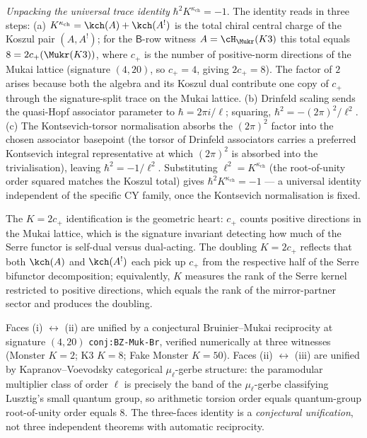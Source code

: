 \begin{theorem}
\emph{Unpacking the universal trace identity} $\hbar^2 K^{\kappa_{\mathrm{ch}}}
= -1$. The identity reads in three steps: (a) $K^{\kappa_{\mathrm{ch}}}
= \kch(A) + \kch(A^!)$ is the total chiral central charge of the
Koszul pair $(A, A^!)$; for the $\mathsf{B}$-row witness $A =
\cH_{\Mukr}(K3)$ this total equals $8 = 2c_+(\Mukr(K3))$, where $c_+$
is the number of positive-norm directions of the Mukai lattice
(signature $(4, 20)$, so $c_+ = 4$, giving $2c_+ = 8$). The factor of
$2$ arises because both the algebra and its Koszul dual contribute one
copy of $c_+$ through the signature-split trace on the Mukai lattice.
(b) Drinfeld scaling sends the quasi-Hopf associator parameter to
$\hbar = 2\pi i / \ell$; squaring, $\hbar^2 = -(2\pi)^2/\ell^2$. (c)
The Kontsevich-torsor normalisation absorbs the $(2\pi)^2$ factor
into the chosen associator basepoint (the torsor of Drinfeld
associators carries a preferred Kontsevich integral representative
at which $(2\pi)^2$ is absorbed into the trivialisation), leaving
$\hbar^2 = -1/\ell^2$. Substituting $\ell^2 = K^{\kappa_{\mathrm{ch}}}$
(the root-of-unity order squared matches the Koszul total) gives
$\hbar^2 K^{\kappa_{\mathrm{ch}}} = -1$ --- a universal identity
independent of the specific CY family, once the Kontsevich
normalisation is fixed.

The $K = 2c_+$ identification is the geometric heart: $c_+$ counts
positive directions in the Mukai lattice, which is the signature
invariant detecting how much of the Serre functor is self-dual versus
dual-acting. The doubling $K = 2c_+$ reflects that both $\kch(A)$ and
$\kch(A^!)$ each pick up $c_+$ from the respective half of the
Serre bifunctor decomposition; equivalently, $K$ measures the
rank of the Serre kernel restricted to positive directions, which
equals the rank of the mirror-partner sector and produces the
doubling.

Faces (i) $\leftrightarrow$ (ii) are unified by a conjectural
Bruinier--Mukai reciprocity at signature $(4, 20)$
\texttt{conj:BZ-Muk-Br}, verified numerically at three witnesses
(Monster $K = 2$; K3 $K = 8$; Fake Monster $K = 50$). Faces
(ii) $\leftrightarrow$ (iii) are unified by Kapranov--Voevodsky
categorical $\mu_\ell$-gerbe structure: the paramodular multiplier
class of order $\ell$ is precisely the band of the $\mu_\ell$-gerbe
classifying Lusztig's small quantum group, so arithmetic torsion
order equals quantum-group root-of-unity order equals $8$. The
three-faces identity is a \emph{conjectural unification}, not three
independent theorems with automatic reciprocity.


\end{theorem}

